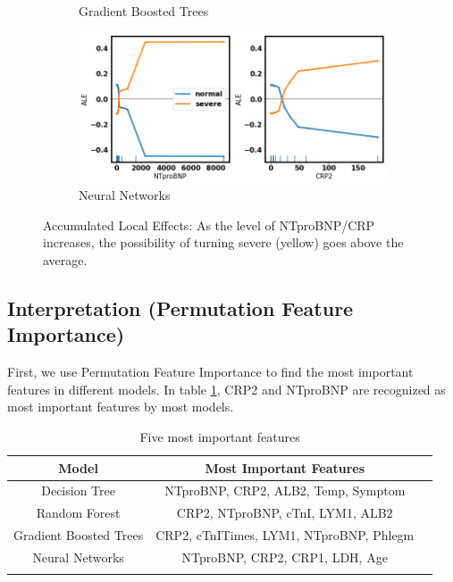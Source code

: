 \begin{figure}
\begin{subfigure}[b]{0.485\textwidth}
    \caption{Gradient Boosted Trees}
    \label{fig:gbt_ale}
\end{subfigure}
\hfill
\begin{subfigure}[b]{0.485\textwidth}
    \centering
    \includegraphics[width=\textwidth]{figures/chapter_interp/nn_ALE_NTproBNP_CRP.png}
    \caption{Neural Networks}
    \label{fig:nn_ale}
\end{subfigure}
\caption{Accumulated Local Effects: As the level of NTproBNP/CRP increases, the possibility of turning severe (yellow) goes above the average.}
\label{fig.ale}
\end{figure}

\newpage
\subsection{Interpretation (Permutation Feature Importance)}

First, we use  Permutation Feature Importance to find the most important features in different models. In table \ref{tab:important_feature}, CRP2 and NTproBNP are recognized as most important features by most models.

\begin{table}[H]
\centering
\caption{Five most important features}
\begin{tabular}{@{}ccc@{}}
\toprule
Model                   & Most Important Features \\ \midrule
Decision Tree           & NTproBNP, CRP2, ALB2, Temp, Symptom      \\
Random Forest           & CRP2, NTproBNP, cTnI, LYM1, ALB2         \\
Gradient Boosted Trees  & CRP2, cTnITimes, LYM1, NTproBNP, Phlegm  \\
Neural Networks         & NTproBNP, CRP2, CRP1, LDH, Age           \\  \bottomrule
\label{tab:important_feature}
\end{tabular}
\end{table}

